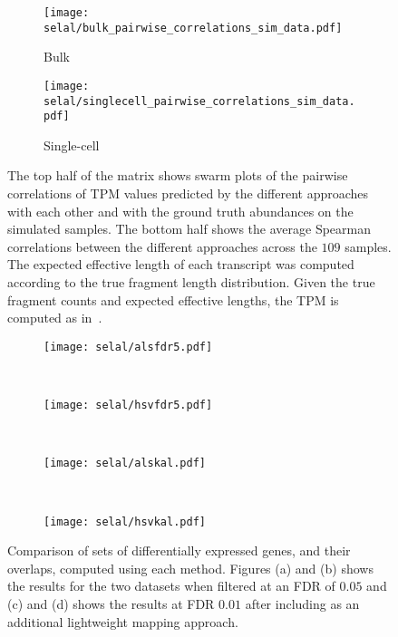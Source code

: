 \begin{figure}[h!]
    \centering
     \begin{subfigure}[t]{0.49\textwidth}
     \centering
  	  	\texttt{[image: selal/bulk\_pairwise\_correlations\_sim\_data.pdf]}
		\caption{Bulk}
    \end{subfigure}
     \begin{subfigure}[t]{0.49\textwidth}
     \centering
  	  	\texttt{[image: selal/singlecell\_pairwise\_correlations\_sim\_data.pdf]}
		\caption{Single-cell}
    \end{subfigure}
     \caption{The top half of the matrix shows swarm plots of the pairwise correlations of TPM 
	 values predicted by the
       different approaches with each other and with the ground truth abundances
       on the simulated samples. The bottom half shows the average Spearman
       correlations between the different approaches across the $109$ samples.
       The expected effective length of each transcript was computed according
       to the true fragment length distribution. Given the true fragment counts
       and expected effective lengths, the TPM is computed as in~\citet{rsem}.}
    \label{fig:swarmsimTPM}
\end{figure}

\begin{figure}[ht!]
    \centering
    \begin{subfigure}[t]{0.49\textwidth}
        \centering
  	  	\texttt{[image: selal/alsfdr5.pdf]}
		\caption{}
    \end{subfigure}
    ~ 
    \begin{subfigure}[t]{0.49\textwidth}
        \centering
  	  	\texttt{[image: selal/hsvfdr5.pdf]}
		\caption{}
    \end{subfigure}
    ~
    \begin{subfigure}[t]{0.49\textwidth}
        \centering
  	  	\texttt{[image: selal/alskal.pdf]}
		\caption{}
    \end{subfigure}
    ~ 
    \begin{subfigure}[t]{0.49\textwidth}
        \centering
  	  	\texttt{[image: selal/hsvkal.pdf]}
		\caption{}
    \end{subfigure}
    \caption{Comparison of sets of differentially expressed genes, and their overlaps, computed using each method.
    Figures (a) and (b) shows the results for the two datasets when filtered at an FDR of $0.05$ and 
    (c) and (d) shows the results at FDR $0.01$ after including \kallisto as an additional lightweight mapping approach.}
    \label{fig:suppdge}
\end{figure}

